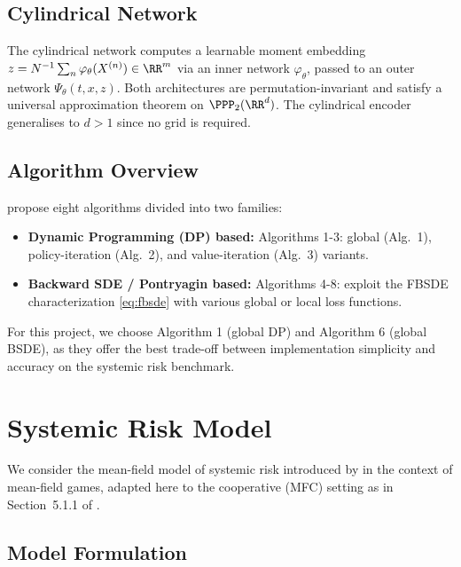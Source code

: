 \documentclass[11pt]{article}
\begin{document}
\subsection{Cylindrical Network}

The cylindrical network computes a learnable moment embedding $z = N^{-1}\sum_n \varphi_\theta(X^{(n)}) \in \RR^m$ via an inner network $\varphi_\theta$, passed to an outer network $\Psi_\theta(t, x, z)$. Both architectures are permutation-invariant and satisfy a universal approximation theorem on $\PPP_2(\RR^d)$. The cylindrical encoder generalises to $d > 1$ since no grid is required.

\subsection{Algorithm Overview}

\citet{pham2024mfnn} propose eight algorithms divided into two families:
\begin{itemize}
  \item \textbf{Dynamic Programming (DP) based:} Algorithms 1-3: global (Alg.~1), policy-iteration (Alg.~2), and value-iteration (Alg.~3) variants.
  \item \textbf{Backward SDE / Pontryagin based:} Algorithms 4-8: exploit the FBSDE characterization \eqref{eq:fbsde} with various global or local loss functions.
\end{itemize}

For this project, we choose Algorithm 1 (global DP) and Algorithm 6 (global BSDE), as they offer the best trade-off between implementation simplicity and accuracy on the systemic risk benchmark.


\section{Systemic Risk Model}\label{sec:appendix-systemic}

We consider the mean-field model of systemic risk introduced by \citet{carmona2015systemic} in the context of mean-field games, adapted here to the cooperative (MFC) setting as in Section~5.1.1 of \citet{pham2024mfnn}.

\subsection{Model Formulation}
\end{document}
